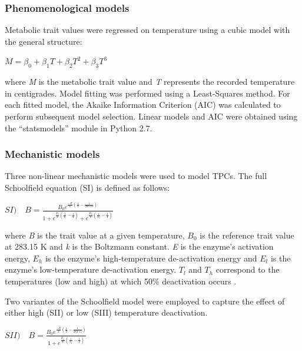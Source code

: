 \documentclass[11pt]{article}  %
\begin{document}
\subsubsection*{Phenomenological models}

Metabolic trait values were regressed on temperature using a cubic model with the general structure: 

\begin{center}
\(M =  \beta_0 + \beta_1 T +\beta_2 T^2 + \beta_3 T^3\)
\end{center}

\noindent where \textit{M} is the metabolic trait value and \textit{T} represents the recorded temperature in centigrades. Model fitting was performed using a Least-Squares method. For each fitted model, the Akaike Information Criterion (AIC) was calculated to perform subsequent model selection. Linear models and AIC were obtained using the ``statsmodels'' module in Python 2.7.

\subsubsection*{Mechanistic models}

Three non-linear mechanistic models were used to model TPCs. The full Schoolfield equation (SI) is defined as follows:


\begin{center}
\( SI)\quad B = \frac{B_0 e^{\frac{-E}{k}(\frac{1}{T}-\frac{1}{283.15})}}{1+e^{\frac{E_l}{k}(\frac{1}{T_l}-\frac{1}{T})}+e^{\frac{E_h}{k}(\frac{1}{T_h}-\frac{1}{T})}}\)
\end{center}

\noindent where \textit{B}  is the trait value at a given temperature, \(B_0\) is the reference trait value at 283.15 K and \textit{k} is the Boltzmann constant. \textit{E} is the enzyme's activation energy, \textit{\(E_h\)} is the enzyme's high-temperature de-activation energy and \textit{\(E_l\)} is the enzyme's low-temperature de-activation energy. \textit{\(T_l\)} and \textit{\(T_h\)} correspond to the temperatures (low and high) at which 50\% deactivation occurs \cite{Schoolfield}. 

Two variantes of the Schoolfield model were employed to capture the effect of either high (SII) or low (SIII) temperature deactivation.

\begin{center}
\(SII)\quad B = \frac{B_0 e^{\frac{-E}{k}(\frac{1}{T}-\frac{1}{283.15})}}{1+e^{\frac{E_h}{k}(\frac{1}{T_h}-\frac{1}{T})}}\)
\end{center}
\end{document}
